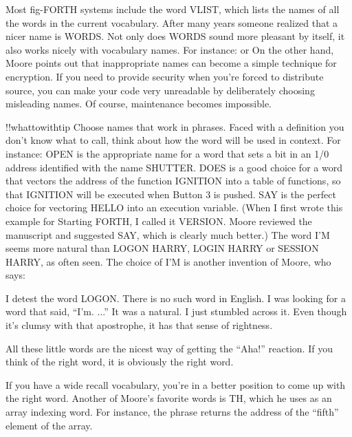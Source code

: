 Most fig-FORTH systems include the word VLIST, which lists the
names of all the words in the current vocabulary.  After many years someone
realized that a nicer name is WORDS.  Not only does WORDS sound
more pleasant by itself, it also works nicely with vocabulary names.  For
instance:
or
On the other hand, Moore points out that inappropriate names can
become a simple technique for encryption.  If you need to provide security
when you're forced to distribute source, you can make your code very
unreadable by deliberately choosing misleading names.  Of course, maintenance
becomes impossible.

!!whattowithtip{
Choose names that work in phrases.
}
Faced with a definition you don't know what to call, think about how the
word will be used in context.  For instance:
OPEN is the appropriate name for a word that sets a
bit in an 1/0 address identified with the name
SHUTTER.
DOES is a good choice for a word that vectors the
address of the function IGNITION into a table of
functions, so that IGNITION will be executed when
Button 3 is pushed.
SAY is the perfect choice for vectoring HELLO into an
execution variable.  (When I first wrote this example
for Starting FORTH, I called it VERSION.  Moore
reviewed the manuscript and suggested SAY, which is
clearly much better.)
The word I'M seems more natural than LOGON HARRY,
LOGIN HARRY or SESSION HARRY, as often seen.
The choice of I'M is another invention of Moore, who says:

I detest the word LOGON.  There is no such word in English.  I was looking
for a word that said, ``I'm. ...'' It was a natural.  I just stumbled across it.
Even though it's clumsy with that apostrophe, it has that sense of
rightness.

All these little words are the nicest way of getting the ``Aha!'' reaction.  If
you think of the right word, it is obviously the right word.

If you have a wide recall vocabulary, you're in a better position to come up
with the right word.
Another of Moore's favorite words is TH, which he uses as an array indexing
word.  For instance, the phrase
returns the address of the ``fifth'' element of the array.

